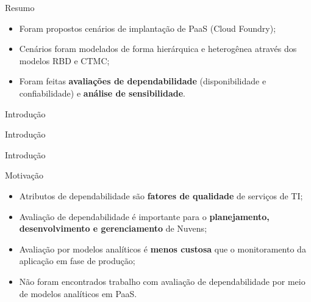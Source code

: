 \documentclass{beamer}
\begin{document}
    \begin{frame}{Resumo}
    
        \begin{itemize}
        	\item Foram propostos cenários de implantação de PaaS (Cloud Foundry);
        \end{itemize}
        
        \begin{itemize}
        	\item Cenários foram modelados de forma hierárquica e heterogênea através dos modelos RBD e CTMC;
        \end{itemize}
        
        \begin{itemize}
        	\item Foram feitas \textbf{avaliações de dependabilidade} (disponibilidade e confiabilidade) e \textbf{análise de sensibilidade}.
        \end{itemize}
    
    \end{frame}
    
    \begin{frame}{Introdução}
        \Huge{\centerline{Introdução}}
    \end{frame}
    
    \begin{frame}{Introdução}
    
        Motivação
        
        \begin{itemize}
        	\item Atributos de dependabilidade são \textbf{fatores de qualidade} de serviços de TI;
        \end{itemize}

        \begin{itemize}
        	\item Avaliação de dependabilidade é importante para o \textbf{planejamento, desenvolvimento e gerenciamento} de Nuvens;
        \end{itemize}        
    
        \begin{itemize}
        	\item Avaliação por modelos analíticos é \textbf{menos custosa} que o monitoramento da aplicação em fase de produção;
        \end{itemize}
        
        \begin{itemize}
        	\item Não foram encontrados trabalho com avaliação de dependabilidade por meio de modelos analíticos em PaaS.
        \end{itemize}

    \end{frame}
    
\end{document}
